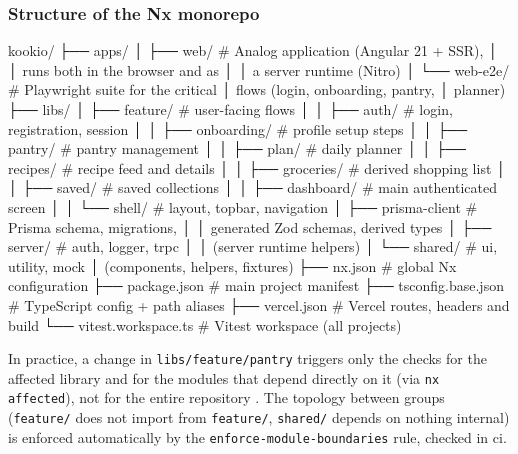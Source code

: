 \subsubsection{Structure of the Nx monorepo}\label{subsec:structura-monorepo}
\vspace{0.3cm}
\begin{TreeVerb}
kookio/
├── apps/
│   ├── web/                    # Analog application (Angular 21 + SSR),
│   │                             runs both in the browser and as
│   │                             a server runtime (Nitro)
│   └── web-e2e/                # Playwright suite for the critical
│                                 flows (login, onboarding, pantry,
│                                 planner)
├── libs/
│   ├── feature/                # user-facing flows
│   │   ├── auth/               #   login, registration, session
│   │   ├── onboarding/         #   profile setup steps
│   │   ├── pantry/             #   pantry management
│   │   ├── plan/               #   daily planner
│   │   ├── recipes/            #   recipe feed and details
│   │   ├── groceries/          #   derived shopping list
│   │   ├── saved/              #   saved collections
│   │   ├── dashboard/          #   main authenticated screen
│   │   └── shell/              #   layout, topbar, navigation
│   ├── prisma-client           # Prisma schema, migrations,
│   │                             generated Zod schemas, derived types
│   ├── server/                 # auth, logger, trpc
│   │                             (server runtime helpers)
│   └── shared/                 # ui, utility, mock
│                                 (components, helpers, fixtures)
├── nx.json                     # global Nx configuration
├── package.json                # main project manifest
├── tsconfig.base.json          # TypeScript config + path aliases
├── vercel.json                 # Vercel routes, headers and build
└── vitest.workspace.ts         # Vitest workspace (all projects)
\end{TreeVerb}
\vspace{0.3cm}

In practice, a change in \texttt{libs/feature/pantry} triggers only the checks for the affected library and for the modules that depend directly on it (via \texttt{nx affected}), not for the entire repository \cite{nx}. The topology between groups (\texttt{feature/} does not import from \texttt{feature/}, \texttt{shared/} depends on nothing internal) is enforced automatically by the \texttt{enforce-module-boundaries} rule, checked in \acrshort{ci}.

